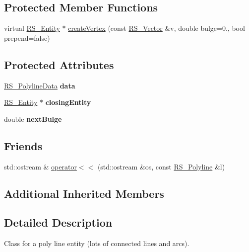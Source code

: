 \subsection*{Protected Member Functions}
\begin{DoxyCompactItemize}
\item 
virtual \hyperlink{classRS__Entity}{R\-S\-\_\-\-Entity} $\ast$ \hyperlink{classRS__Polyline_a8370a9629eb9109846f87c93388622e6}{create\-Vertex} (const \hyperlink{classRS__Vector}{R\-S\-\_\-\-Vector} \&v, double bulge=0., bool prepend=false)
\end{DoxyCompactItemize}
\subsection*{Protected Attributes}
\begin{DoxyCompactItemize}
\item 
\hypertarget{classRS__Polyline_aade5a8fd3263c4a16cec4d976f40151e}{\hyperlink{classRS__PolylineData}{R\-S\-\_\-\-Polyline\-Data} {\bfseries data}}\label{classRS__Polyline_aade5a8fd3263c4a16cec4d976f40151e}

\item 
\hypertarget{classRS__Polyline_ac29062d7a9deeb74036e06b54b79fb72}{\hyperlink{classRS__Entity}{R\-S\-\_\-\-Entity} $\ast$ {\bfseries closing\-Entity}}\label{classRS__Polyline_ac29062d7a9deeb74036e06b54b79fb72}

\item 
\hypertarget{classRS__Polyline_aefaf59d1e0629ab1dda7b6d5b4df2d7f}{double {\bfseries next\-Bulge}}\label{classRS__Polyline_aefaf59d1e0629ab1dda7b6d5b4df2d7f}

\end{DoxyCompactItemize}
\subsection*{Friends}
\begin{DoxyCompactItemize}
\item 
std\-::ostream \& \hyperlink{classRS__Polyline_ae77803e5221328ea2a94bc8c2f9da54d}{operator$<$$<$} (std\-::ostream \&os, const \hyperlink{classRS__Polyline}{R\-S\-\_\-\-Polyline} \&l)
\end{DoxyCompactItemize}
\subsection*{Additional Inherited Members}


\subsection{Detailed Description}
Class for a poly line entity (lots of connected lines and arcs).


